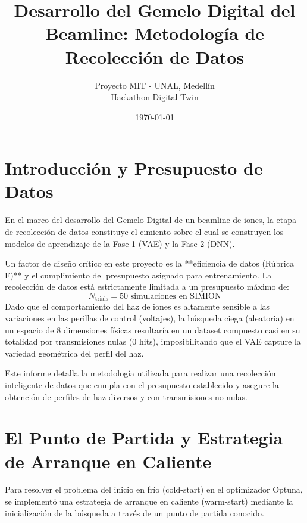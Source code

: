 \documentclass[12pt,letterpaper]{article}
\title{\textbf{Desarrollo del Gemelo Digital del Beamline: Metodología de Recolección de Datos}}
\author{Proyecto MIT - UNAL, Medellín \\ Hackathon Digital Twin}
\date{\today}
\begin{document}
\maketitle

\tableofcontents
\newpage

\section{Introducción y Presupuesto de Datos}
En el marco del desarrollo del Gemelo Digital de un beamline de iones, la etapa de recolección de datos constituye el cimiento sobre el cual se construyen los modelos de aprendizaje de la Fase 1 (VAE) y la Fase 2 (DNN). 

Un factor de diseño crítico en este proyecto es la **eficiencia de datos (Rúbrica F)** y el cumplimiento del presupuesto asignado para entrenamiento. La recolección de datos está estrictamente limitada a un presupuesto máximo de:
\begin{equation}
    N_{\text{trials}} = 50 \text{ simulaciones en SIMION}
\end{equation}
Dado que el comportamiento del haz de iones es altamente sensible a las variaciones en las perillas de control (voltajes), la búsqueda ciega (aleatoria) en un espacio de 8 dimensiones físicas resultaría en un dataset compuesto casi en su totalidad por transmisiones nulas ($0$ hits), imposibilitando que el VAE capture la variedad geométrica del perfil del haz. 

Este informe detalla la metodología utilizada para realizar una recolección inteligente de datos que cumpla con el presupuesto establecido y asegure la obtención de perfiles de haz diversos y con transmisiones no nulas.

\section{El Punto de Partida y Estrategia de Arranque en Caliente}
Para resolver el problema del inicio en frío (cold-start) en el optimizador Optuna, se implementó una estrategia de arranque en caliente (warm-start) mediante la inicialización de la búsqueda a través de un punto de partida conocido.
\end{document}

